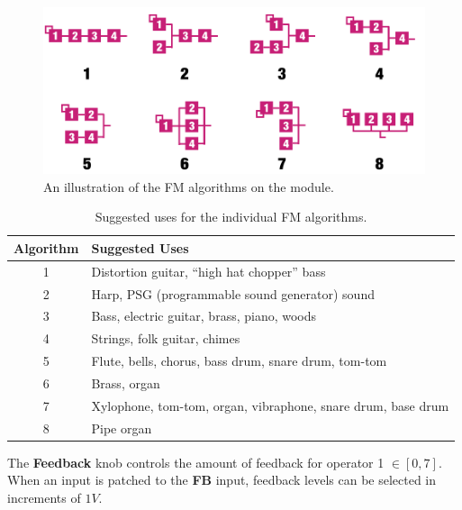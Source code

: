 \documentclass[12pt,letter]{article}
\begin{document}
\begin{figure}[!htp]
\centering
\caption{An illustration of the FM algorithms on the module.}
\label{fig:fm-algorithms}
\includegraphics[width=\maxwidth{\textwidth}]{Operators}
\end{figure}

\begin{table}[!htp]
\centering
\caption{Suggested uses for the individual FM algorithms.}
\label{tab:fm-algorithm-instruments}
\begin{tabular}{|c|l|}
\hline
\textbf{Algorithm} & \textbf{Suggested Uses}                             \\
\hline\hline
1         & Distortion guitar, ``high hat chopper'' bass                 \\
\hline
2         & Harp, PSG (programmable sound generator) sound               \\
\hline
3         & Bass, electric guitar, brass, piano, woods                   \\
\hline
4         & Strings, folk guitar, chimes                                 \\
\hline
5         & Flute, bells, chorus, bass drum, snare drum, tom-tom         \\
\hline
6         & Brass, organ                                                 \\
\hline
7         & Xylophone, tom-tom, organ, vibraphone, snare drum, base drum \\
\hline
8         & Pipe organ                                                   \\
\hline
\end{tabular}
\end{table}

The \textbf{Feedback} knob controls the amount of feedback for operator 1 $\in [0, 7]$. When an input is patched to the \textbf{FB} input, feedback levels can be selected in increments of $1V$.
\end{document}
